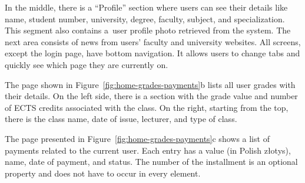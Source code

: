 In the middle, there is a ``Profile'' section where users can see their details like name, student number, university, degree, faculty, subject, and specialization. This segment also contains a~user profile photo retrieved from the system. The next area consists of news from users' faculty and university websites.
All screens, except the login page, have bottom navigation. It allows users to change tabs and quickly see which page they are currently on.

The page shown in Figure~\ref{fig:home-grades-payments}b lists all user grades with their details. On the left side, there is a section with the grade value and number of ECTS credits associated with the class. On the right, starting from the top, there is the class name, date of issue, lecturer, and type of class.

The page presented in Figure~\ref{fig:home-grades-payments}c shows a list of payments related to the current user. Each entry has a value (in Polish złotys), name, date of payment, and status. The number of the installment is an optional property and does not have to occur in every element.

